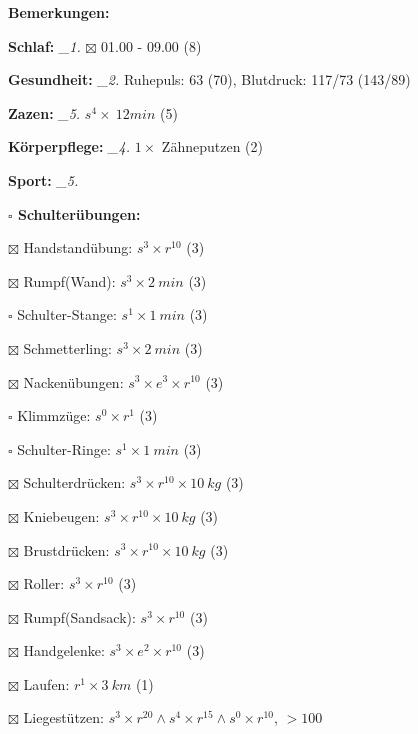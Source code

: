 \documentclass[10pt,a4paper]{article}
\newcommand\prop[1] {{\color {alizarin} {\bf #1}}}        %
\newcommand\mand[1] {{\color {burntorange} {\bf #1}}}     %
\newcommand\topspace{\vskip -15pt \hskip 20pt}
\newcommand\n[1] { {\sl #1.} \hskip 5pt }
\begin{document}
\begin{mdframed}[style=daystyle]
  \begin{labeling}{{\mand {Bemerkungen:}}}
    \setlength\itemsep{-3pt}
  \item[{\mand {Schlaf:}}]        \n{\_1} $\boxtimes$ 01.00 - 09.00 (8)
  \item[{\mand {Gesundheit:}}]    \n{\_2} Ruhepuls: 63 (70), Blutdruck: 117/73 (143/89)
  \item[{\mand {Zazen:}}]         \n{\_5} $s^4 \times\ 12 min$ (5)
  \item[{\mand {Körperpflege:}}]  \n{\_4} $1 \times$ Zähneputzen (2)
  \item[{\mand {Sport:}}]         \n{\_5}
    \topspace
    \begin{minipage}{0.75\textwidth}  
      \begin{labeling}{\prop {$\square$ {Schulterübungen:}}} 
        \setlength\itemsep{-3pt}
      \item[$\boxtimes$ Handstandübung:]  $s^3 \times r^{10}$ (3)
      \item[$\boxtimes$ Rumpf(Wand):]     $s^3 \times 2\ min$ (3)
      \item[$\square$ Schulter-Stange:] $s^1 \times 1\ min$ (3)
      \item[$\boxtimes$ Schmetterling:]   $s^3 \times 2\ min$ (3)
      \item[$\boxtimes$ Nackenübungen:]   $s^3 \times e^3 \times r^{10}$ (3)
      \item[$\square$ Klimmzüge:]       $s^0 \times r^1$ (3)
      \item[$\square$ Schulter-Ringe:]  $s^1 \times 1\ min$ (3)
      \item[$\boxtimes$ Schulterdrücken:] $s^3 \times r^{10} \times 10\ kg$ (3)
      \item[$\boxtimes$ Kniebeugen:]      $s^3 \times r^{10} \times 10\ kg$ (3)
      \item[$\boxtimes$ Brustdrücken:]    $s^3 \times r^{10} \times 10\ kg$ (3)
      \item[$\boxtimes$ Roller:]          $s^3 \times r^{10}$ (3)
      \item[$\boxtimes$ Rumpf(Sandsack):] $s^3 \times r^{10}$ (3)
      \item[$\boxtimes$ Handgelenke:]     $s^3 \times e^2 \times r^{10}$ (3)
      \item[$\boxtimes$ Laufen:]          $r^1 \times 3\ km$ (1)
      \item[$\boxtimes$ Liegestützen:]    $s^3 \times r^{20} \land s^4 \times r^{15} \land s^0 \times r^{10}$, $> 100$

\end{labeling}
\end{minipage}
\end{labeling}
\end{mdframed}
\end{document}
